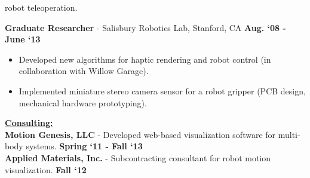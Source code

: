 \documentclass[line,margin]{res}
\newenvironment{compactlist}{
	\begin{itemize}\itemsep=0pt
}{
	\end{itemize}
}
\newcommand{\CVOnly}[1]{}
\newcommand{\CVOnly}[1]{#1}
\newcommand{\hide}[1]{}
\begin{document}
\begin{resume}
\begin{compactlist}
      robot teleoperation.
  \end{compactlist}
{\bf Graduate Researcher} - Salisbury Robotics Lab, Stanford, CA
  \hfill \textbf{Aug. `08 - June `13}
  \begin{compactlist}
    \item Developed new algorithms for haptic rendering and robot control
      (in collaboration with Willow Garage).
    \item Implemented miniature stereo camera sensor for a robot gripper
      (PCB design, mechanical hardware prototyping).
  \end{compactlist}
\CVOnly{
{\bf Electrical Engineering Intern} - Qual-Tron, Inc., Tulsa, OK
  \hfill \textbf{March `06 - Feb. `07}
  \begin{compactlist}
    \item Designed and implemented test procedures for IR and magnetic sensor products.
    \item Led redesign of a magnetic sensor product to reduce cost and simplify assembly.
  \end{compactlist}
}
%
\hide{
  \\[0.4pc]{\bf Summer Intern} - Atmel Corporation
    \hfill \textbf{Summer `05}
  \\[0.4pc]{\bf Summer Research Intern} - NASA Glenn Research Center
    \hfill \textbf{Summer `04}%
}
%
{\bf \underline{Consulting:}}
  {\\[0.2pc]{\bf Motion Genesis, LLC}
    - Developed web-based visualization software for multi-body systems.
      \hfill \textbf{Spring `11 - Fall `13}}%
  {\\[0.0pc]{\bf Applied Materials, Inc.}
    - Subcontracting consultant for robot motion visualization.
      \hfill \textbf{Fall `12}}%
  \CVOnly{\\[0.0pc]{\bf Charm Labs}
    - Dynamics and control. Confidential.
      \hfill \textbf{Summer `12}}%
%
%

\end{resume}
\end{document}

